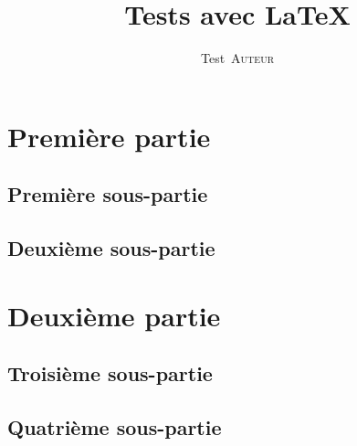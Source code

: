 \documentclass[french,12pt]{article}
\title{Tests avec \LaTeX}
\author{Test~\textsc{Auteur}}
\begin{document}
\maketitle

\section{Première partie}

\subsection{Première sous-partie}

\lipsum[1]

\subsection{Deuxième sous-partie}

\lipsum[2]

\section{Deuxième partie}

\subsection{Troisième sous-partie}

\lipsum[3]

\subsection{Quatrième sous-partie}

\lipsum[4]
\end{document}
